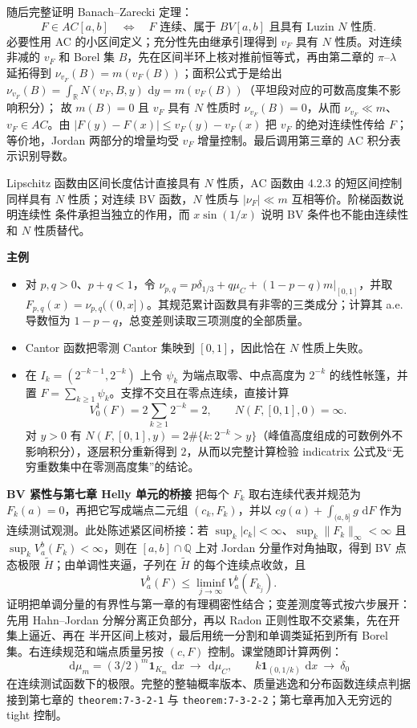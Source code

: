 \documentclass[11pt,a4paper]{ctexart}
\newcommand{\R}{\mathbb R}
\newcommand{\dd}{\,\mathrm d}
\newcommand{\planitem}[1]{\par\smallskip\noindent\textcolor{deepblue}{\textbf{#1}}\quad}
\begin{document}
随后完整证明 Banach--Zarecki 定理：
\[
F\in AC[a,b]
\quad\Longleftrightarrow\quad
F\text{ 连续、属于 }BV[a,b]\text{ 且具有 Luzin }N\text{ 性质}.
\]
必要性用 AC 的小区间定义；充分性先由继承引理得到 $v_F$ 具有 $N$ 性质。对连续非减的
$v_F$ 和 Borel 集 $B$，先在区间半环上核对推前恒等式，再由第二章的
$\pi$--$\lambda$ 延拓得到 $\nu_{v_F}(B)=m(v_F(B))$；面积公式于是给出
$\nu_{v_F}(B)=\int_\R N(v_F,B,y)\,\dd y=m(v_F(B))$（平坦段对应的可数高度集不影响积分）；
故 $m(B)=0$ 且 $v_F$ 具有 $N$ 性质时 $\nu_{v_F}(B)=0$，从而 $\nu_{v_F}\ll m$、
$v_F\in AC$。由
$|F(y)-F(x)|\le v_F(y)-v_F(x)$ 把 $v_F$ 的绝对连续性传给 $F$；等价地，Jordan 两部分的增量均受 $v_F$ 增量控制。最后调用第三章的 AC 积分表示识别导数。

Lipschitz 函数由区间长度估计直接具有 $N$ 性质，AC 函数由 4.2.3 的短区间控制同样具有
$N$ 性质；对连续 BV 函数，$N$ 性质与 $|\nu_F|\ll m$ 互相等价。阶梯函数说明连续性
条件承担当独立的作用，而 $x\sin(1/x)$ 说明 BV 条件也不能由连续性和 $N$ 性质替代。

\planitem{主例}
\begin{itemize}
\item 对 $p,q>0$、$p+q<1$，令
$\nu_{p,q}=p\delta_{1/3}+q\mu_C+(1-p-q)m|_{[0,1]}$，并取
$F_{p,q}(x)=\nu_{p,q}((0,x])$。其规范累计函数具有非零的三类成分；计算其
a.e. 导数恒为 $1-p-q$，总变差则读取三项测度的全部质量。
\item Cantor 函数把零测 Cantor 集映到 $[0,1]$，因此恰在 $N$ 性质上失败。
\item 在 $I_k=(2^{-k-1},2^{-k})$ 上令 $\psi_k$ 为端点取零、中点高度为 $2^{-k}$ 的线性帐篷，并置 $F=\sum_{k\ge1}\psi_k$。支撑不交且在零点连续，直接计算
\[
V_0^1(F)=2\sum_{k\ge1}2^{-k}=2,
\qquad N(F,[0,1],0)=\infty.
\]
对 $y>0$ 有
$N(F,[0,1],y)=2\#\{k:2^{-k}>y\}$（峰值高度组成的可数例外不影响积分），逐层积分重新得到 $2$，从而以完整计算检验 indicatrix 公式及“无穷重数集中在零测高度集”的结论。
\end{itemize}

\planitem{BV 紧性与第七章 Helly 单元的桥接}
把每个 $F_k$ 取右连续代表并规范为 $F_k(a)=0$，再把它写成端点二元组 $(c_k,F_k)$，并以
$cg(a)+\int_{(a,b]}g\,\dd F$ 作为连续测试观测。此处陈述紧区间桥接：若
$\sup_k|c_k|<\infty$、$\sup_k\|F_k\|_\infty<\infty$ 且 $\sup_kV_a^b(F_k)<\infty$，则在
$[a,b]\cap\mathbb Q$ 上对 Jordan 分量作对角抽取，得到 BV 点态极限
$\widetilde H$；由单调性夹逼，子列在 $\widetilde H$ 的每个连续点收敛，且
\[
 V_a^b(F)\le\liminf_{j\to\infty}V_a^b(F_{k_j}).
\]
证明把单调分量的有界性与第一章的有理稠密性结合；变差测度等式按六步展开：先用
Hahn--Jordan 分解分离正负部分，再以 Radon 正则性取不交紧集，先在开集上逼近、再在
半开区间上核对，最后用统一分割和单调类延拓到所有 Borel 集。右连续规范和端点质量另按
$(c,F)$ 控制。课堂随即计算两例：
\[
 \dd\mu_m=(3/2)^m\mathbf1_{K_m}\,\dd x\ \longrightarrow\ \dd\mu_C,
 \qquad
 k\mathbf1_{(0,1/k)}\,\dd x\ \longrightarrow\ \delta_0
\]
在连续测试函数下的极限。完整的整轴概率版本、质量逃逸和分布函数连续点判据接到第七章的
\texttt{theorem:7-3-2-1} 与 \texttt{theorem:7-3-2-2}；第七章再加入无穷远的 tight 控制。
\end{document}
